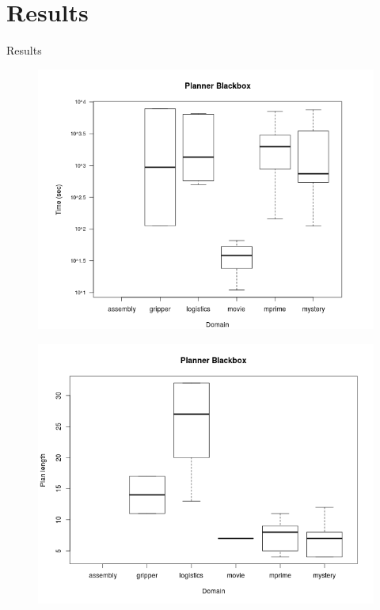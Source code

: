 \documentclass[handout,t]{beamer}
\begin{document}
\section{Results}
\begin{frame}{Results}
  \begin{figure}[ht!]
    \centering
    \includegraphics[width=0.75\linewidth]{bxplt_BB_Domain_Time}
    \label{fig::figura1} 
  \end{figure}  
\end{frame}
\begin{frame}
  \begin{figure}[ht!]
    \centering
    \includegraphics[width=0.75\linewidth]{bxplt_BB_Domain_length}
    \label{fig::figura2} 
  \end{figure}    
\end{frame}
\end{document}
